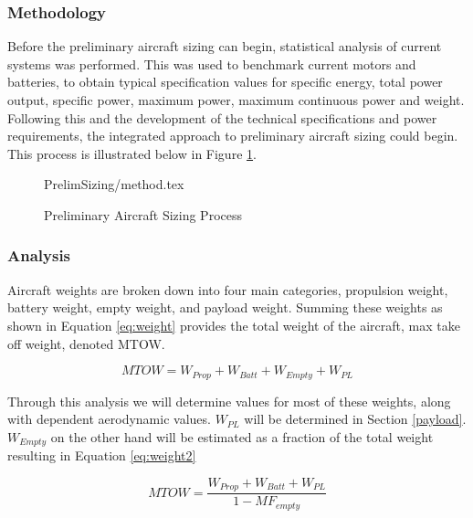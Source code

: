 \subsubsection{Methodology}
Before the preliminary aircraft sizing can begin, statistical analysis of current systems was performed. This was used to benchmark current motors and batteries, to obtain typical specification values for specific energy, total power output, specific power, maximum power, maximum continuous power and weight. Following this and the development of the technical specifications and power requirements, the integrated approach to preliminary aircraft sizing could begin. This process is illustrated below in Figure \ref{fig:meth}.        

 


\begin{figure}[H]
    \centering
    {PrelimSizing/method.tex}
    \caption{Preliminary Aircraft Sizing Process}
    \label{fig:meth}
\end{figure}

\subsubsection{Analysis}

Aircraft weights are broken down into four main categories, propulsion weight, battery weight, empty weight, and payload weight. Summing these weights as shown in Equation \ref{eq:weight} provides the total weight of the aircraft, max take off weight, denoted MTOW. 

\begin{equation}
    MTOW = W_{Prop} + W_{Batt} + W_{Empty} + W_{PL}
    \label{eq:weight}
\end{equation}

Through this analysis we will determine values for most of these weights, along with dependent aerodynamic values. $W_{PL}$ will be determined in Section \ref{payload}. $W_{Empty}$ on the other hand will be estimated as a fraction of the total weight resulting in Equation \ref{eq:weight2}

\begin{equation}
    MTOW = \dfrac{W_{Prop} + W_{Batt} + W_{PL}}{1 - MF_{empty}} 
    \label{eq:weight2}
\end{equation}

